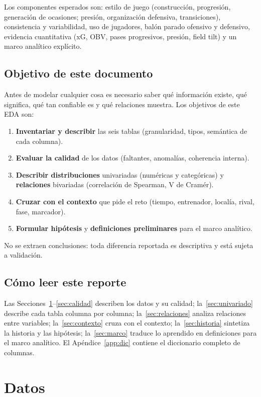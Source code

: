 \documentclass[11pt,a4paper]{article}
\begin{document}
Los componentes esperados son: estilo de juego (construcción, progresión, generación de ocasiones; presión, organización defensiva, transiciones), consistencia y variabilidad, uso de jugadores, balón parado ofensivo y defensivo, evidencia cuantitativa (xG, OBV, pases progresivos, presión, field tilt) y un marco analítico explícito.

\subsection{Objetivo de este documento}
Antes de modelar cualquier cosa es necesario saber qué información existe, qué significa, qué tan confiable es y qué relaciones muestra. Los objetivos de este EDA son:
\begin{enumerate}
  \item \textbf{Inventariar y describir} las seis tablas (granularidad, tipos, semántica de cada columna).
  \item \textbf{Evaluar la calidad} de los datos (faltantes, anomalías, coherencia interna).
  \item \textbf{Describir distribuciones} univariadas (numéricas y categóricas) y \textbf{relaciones} bivariadas (correlación de Spearman, V de Cramér).
  \item \textbf{Cruzar con el contexto} que pide el reto (tiempo, entrenador, localía, rival, fase, marcador).
  \item \textbf{Formular hipótesis} y \textbf{definiciones preliminares} para el marco analítico.
\end{enumerate}
No se extraen conclusiones: toda diferencia reportada es descriptiva y está sujeta a validación.

\subsection{Cómo leer este reporte}
Las Secciones~\ref{sec:datos}--\ref{sec:calidad} describen los datos y su calidad; la~\ref{sec:univariado} describe cada tabla columna por columna; la~\ref{sec:relaciones} analiza relaciones entre variables; la~\ref{sec:contexto} cruza con el contexto; la~\ref{sec:historia} sintetiza la historia y las hipótesis; la~\ref{sec:marco} traduce lo aprendido en definiciones para el marco analítico. El Apéndice~\ref{app:dic} contiene el diccionario completo de columnas.

\section{Datos}\label{sec:datos}
\end{document}
